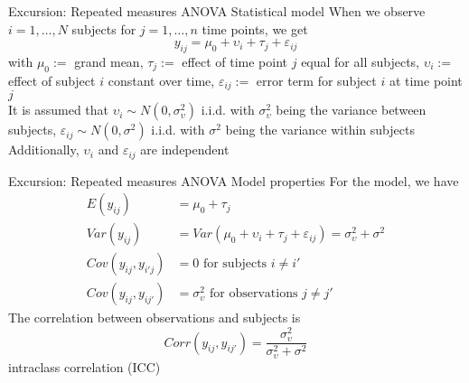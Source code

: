 \documentclass{beamer}
\begin{document}
\begin{frame}{Excursion: Repeated measures ANOVA}
  {Statistical model}
  When we observe $i = 1, \ldots, N$ subjects for $j = 1, \ldots, n$ time
  points, we get
\[
  y_{ij} = \mu_0 + \upsilon_i + \tau_j + \varepsilon_{ij}
\]
with $\mu_0 :=$ grand mean, $\tau_j :=$ effect of time point $j$ equal
  for all subjects, $\upsilon_i := $ effect of subject $i$ constant over
  time, $\varepsilon_{ij} :=$ error term for subject $i$ at time point
  $j$\\[2ex]

  It is assumed that $\upsilon_i \sim N(0, \sigma^2_\upsilon)$ i.i.d. with
  $\sigma^2_\upsilon$ being the variance between subjects,
  $\varepsilon_{ij} \sim N(0, \sigma^2)$ i.i.d. with $\sigma^2$ being the
  variance within subjects\\[2ex]

  Additionally, $\upsilon_i$ and $\varepsilon_{ij}$ are independent\\[2ex]
\end{frame}


\begin{frame}{Excursion: Repeated measures ANOVA}
  {Model properties}
For the model, we have
\begin{align*}
  E(y_{ij})   &= \mu_0 + \tau_j \\
  Var(y_{ij}) &= Var(\mu_0 + \upsilon_i + \tau_j + \varepsilon_{ij})
               = \sigma^2_\upsilon + \sigma^2 \\
  Cov(y_{ij}, y_{i'j}) &= 0 \text{ for subjects } i \neq i' \\
  Cov(y_{ij}, y_{ij'}) &= \sigma^2_\upsilon \text{ for observations }
                          j \neq j'
\end{align*}
The correlation between observations and subjects is
\[
  Corr(y_{ij}, y_{ij'}) = \frac{\sigma^2_\upsilon}{\sigma^2_\upsilon +
    \sigma^2}
\]
intraclass correlation (ICC)
\end{frame}
\end{document}
